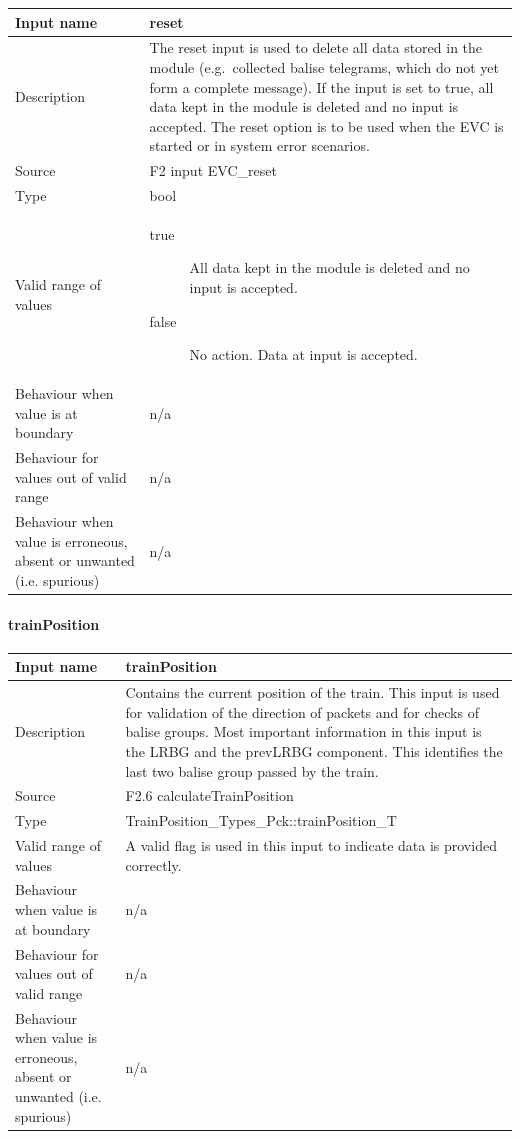 \begin{longtable}{p{}p{}}
\toprule
Input name				& reset \\
\midrule
Description				& The reset input is used to delete all data stored in the module (e.g.~collected balise telegrams, which do not yet form a complete message). If the input is set to true, all data kept in the module is deleted and no input is accepted. The reset option is to be used when the EVC is started or in system error scenarios.\\
\midrule
Source					& F2 input EVC\_reset
\\ \midrule
Type					& bool \\
\midrule
Valid range of values	& 
\begin{description}
\item[true] All data kept in the module is deleted and no input is accepted.
\item[false] No action. Data at input is accepted.
\end{description} \\
\midrule
Behaviour when value is at boundary	& n/a\\
\midrule
Behaviour for values out of valid range	& n/a\\
\midrule
Behaviour when value is erroneous, absent or unwanted (i.e. spurious) & n/a\\
\bottomrule
\end{longtable}
\newpage
\paragraph{trainPosition}

\begin{longtable}{p{}p{}}
\toprule
Input name				& trainPosition \\
\midrule
Description				& Contains the current position of the train. This input is used for validation of the direction of packets and for checks of balise groups. Most important information in this input is the LRBG and the prevLRBG component. This identifies the last two balise group passed by the train.\\
\midrule
Source					& F2.6 calculateTrainPosition \\ 
\midrule
Type					& TrainPosition\_Types\_Pck::trainPosition\_T \\
\midrule
Valid range of values	& A valid flag is used in this input to indicate data is provided correctly.\\
\midrule
Behaviour when value is at boundary	& n/a\\
\midrule
Behaviour for values out of valid range	& n/a\\
\midrule
Behaviour when value is erroneous, absent or unwanted (i.e. spurious) & n/a\\
\bottomrule
\end{longtable}

